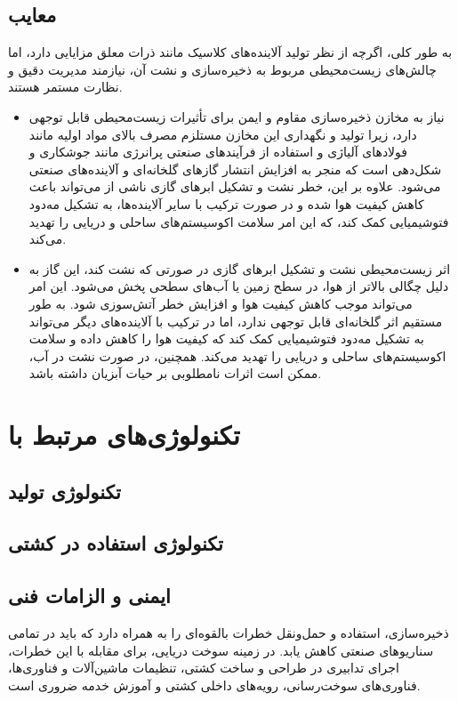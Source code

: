 	\subsection{معایب}
	به طور کلی، اگرچه 
	از نظر تولید آلاینده‌های کلاسیک مانند ذرات معلق مزایایی دارد، اما چالش‌های زیست‌محیطی مربوط به ذخیره‌سازی و نشت آن، نیازمند مدیریت دقیق و نظارت مستمر هستند.
	\begin{itemize}
		\item 
	نیاز به مخازن ذخیره‌سازی مقاوم و ایمن برای
	 تأثیرات زیست‌محیطی قابل توجهی دارد، زیرا تولید و نگهداری این مخازن مستلزم مصرف بالای مواد اولیه مانند فولادهای آلیاژی و استفاده از فرآیندهای صنعتی پرانرژی مانند جوشکاری و شکل‌دهی است که منجر به افزایش انتشار گازهای گلخانه‌ای
	   و آلاینده‌های صنعتی می‌شود. علاوه بر این، خطر نشت و تشکیل ابرهای گازی ناشی از 
	   می‌تواند باعث کاهش کیفیت هوا شده و در صورت ترکیب با سایر آلاینده‌ها، به تشکیل مه‌دود فتوشیمیایی کمک کند، که این امر سلامت اکوسیستم‌های ساحلی و دریایی را تهدید می‌کند.
		\item 
اثر زیست‌محیطی نشت 
 و تشکیل ابرهای گازی در صورتی که
  نشت کند، این گاز به دلیل چگالی بالاتر از هوا، در سطح زمین یا آب‌های سطحی پخش می‌شود. این امر می‌تواند موجب کاهش کیفیت هوا و افزایش خطر آتش‌سوزی شود. 
  به طور مستقیم اثر گلخانه‌ای قابل توجهی ندارد، اما در ترکیب با آلاینده‌های دیگر می‌تواند به تشکیل مه‌دود فتوشیمیایی کمک کند که کیفیت هوا را کاهش داده و سلامت اکوسیستم‌های ساحلی و دریایی را تهدید می‌کند. همچنین، در صورت نشت در آب، ممکن است اثرات نامطلوبی بر حیات آبزیان داشته باشد.
  \cite{osmthome}
	\end{itemize}

\section{تکنولوژی‌های مرتبط با }
\subsection{تکنولوژی تولید}
\subsection{تکنولوژی استفاده در کشتی}
\subsection{ایمنی و الزامات فنی }
ذخیره‌سازی، استفاده و حمل‌ونقل
 خطرات بالقوه‌ای را به همراه دارد که باید در تمامی سناریوهای صنعتی کاهش یابد. در زمینه سوخت دریایی، برای مقابله با این خطرات، اجرای تدابیری در طراحی و ساخت کشتی، تنظیمات ماشین‌آلات و فناوری‌ها، فناوری‌های سوخت‌رسانی، رویه‌های داخلی کشتی و آموزش خدمه ضروری است.
